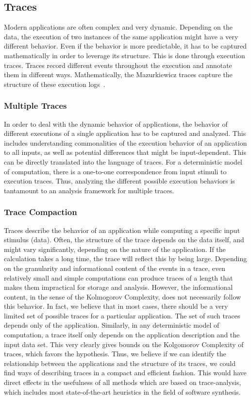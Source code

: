 \documentclass[sigplan,10pt]{acmart}
\begin{document}
\subsection{Traces}
Modern applications are often complex and very dynamic.
Depending on the data, the execution of two instances of the same application might have a very different behavior.
Even if the behavior is more predictable, it has to be captured mathematically in order to leverage its structure.
This is done through execution traces. Traces record different events throughout the execution and annotate them in different ways. Mathematically, the Mazurkiewicz traces capture the structure of these execution logs~\cite{bookoftraces}.

\subsubsection{Multiple Traces}
In order to deal with the dynamic behavior of applications, the behavior of different executions of a single application has to be captured and analyzed.
This includes understanding commonalities of the execution behavior of an application to all inputs, as well as potential differences that might be input-dependent.
This can be directly translated into the language of traces.
For a deterministic model of computation, there is a one-to-one correspondence from input stimuli to execution traces.
Thus, analyzing the different possible execution behaviors is tantamount to an analysis framework for multiple traces.

\subsubsection{Trace Compaction}
Traces describe the behavior of an application while computing a specific input stimulus (data). Often, the structure of the trace depends on the data itself, and might vary significantly, depending on the nature of the application.
If the calculation takes a long time, the trace will reflect this by being large.
Depending on the granularity and informational content of the events in a trace, even relatively small and simple computations can produce traces of a length that makes them impractical for storage and analysis.
However, the informational content, in the sense of the Kolmogorov Complexity, does not necessarily follow this behavior.
In fact, we believe that in most cases, there should be a very limited set of possible traces for a particular application. The set of such traces depends only of the application.
Similarly, in any deterministic model of computation, a trace itself only depends on the application description and the input data set. This very clearly gives bounds on the Kolgomorov Complexity of traces, which favors the hypothesis.
Thus, we believe if we can identify the relationship between the applications and the structure of its traces, we could find ways of describing traces in a compact and efficient fashion. 
This would have direct effects in the usefulness of all methods which are based on trace-analysis, which includes most state-of-the-art heuristics in the field of software synthesis.
\end{document}

